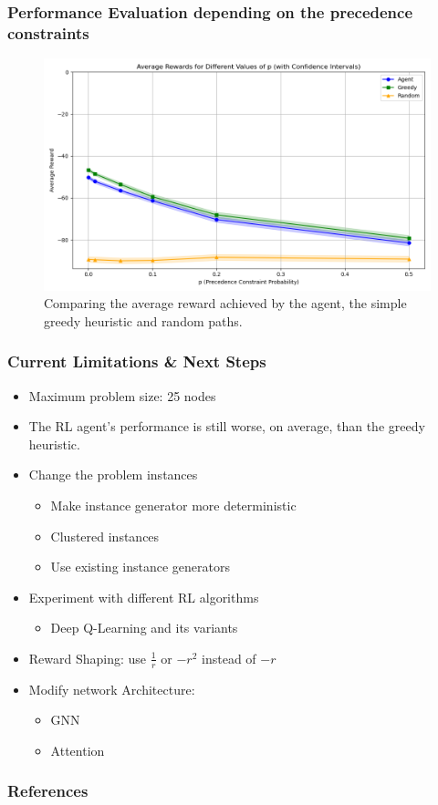 \documentclass{beamer}
\begin{document}
\begin{frame}
    \frametitle{Performance Evaluation depending on the precedence constraints}
    \begin{figure}
        \centering
        \includegraphics[width=1\textwidth]{average_reward_over_p.png}
        \caption{Comparing the average reward achieved by the agent, the simple greedy heuristic and random paths.}
    \end{figure}
\end{frame}



\begin{frame}
\frametitle{Current Limitations \& Next Steps}
\begin{itemize}
    \item Maximum problem size: 25 nodes
    \item The RL agent's performance is still worse, on average, than the greedy heuristic.
    \item Change the problem instances
    \begin{itemize}
        \item Make instance generator more deterministic
        \item Clustered instances
        \item Use existing instance generators
    \end{itemize}

\item Experiment with different RL algorithms
\begin{itemize}
    \item Deep Q-Learning and its variants
\end{itemize}
\item Reward Shaping: use $\frac{1}{r}$ or $-r^2$ instead of $-r$

\item Modify network Architecture:
\begin{itemize}
\item GNN
\item Attention
\end{itemize}


\end{itemize}

\end{frame}
 
\begin{frame}[allowframebreaks]
    \frametitle{References}
    
    
\end{frame}
\end{document}
